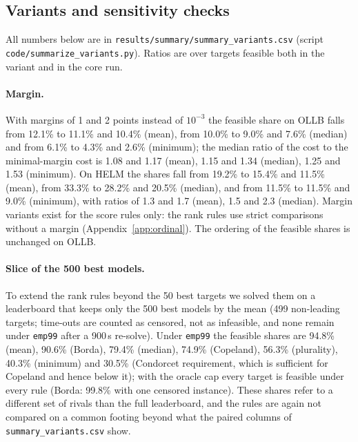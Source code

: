 \documentclass{article}
\begin{document}
\subsection*{Variants and sensitivity checks}
All numbers below are in \texttt{results/summary/summary\_variants.csv} (script \texttt{code/summarize\_variants.py}). Ratios are over targets feasible both in the variant and in the core run.
\paragraph{Margin.} With margins of 1 and 2 points instead of $10^{-3}$ the feasible share on OLLB falls from 12.1\% to 11.1\% and 10.4\% (mean), from 10.0\% to 9.0\% and 7.6\% (median) and from 6.1\% to 4.3\% and 2.6\% (minimum); the median ratio of the cost to the minimal-margin cost is 1.08 and 1.17 (mean), 1.15 and 1.34 (median), 1.25 and 1.53 (minimum). On HELM the shares fall from 19.2\% to 15.4\% and 11.5\% (mean), from 33.3\% to 28.2\% and 20.5\% (median), and from 11.5\% to 11.5\% and 9.0\% (minimum), with ratios of 1.3 and 1.7 (mean), 1.5 and 2.3 (median). Margin variants exist for the score rules only: the rank rules use strict comparisons without a margin (Appendix~\ref{app:ordinal}). The ordering of the feasible shares is unchanged on OLLB.
\paragraph{Slice of the 500 best models.} To extend the rank rules beyond the 50 best targets we solved them on a leaderboard that keeps only the 500 best models by the mean (499 non-leading targets; time-outs are counted as censored, not as infeasible, and none remain under \texttt{emp99} after a 900\,s re-solve). Under \texttt{emp99} the feasible shares are 94.8\% (mean), 90.6\% (Borda), 79.4\% (median), 74.9\% (Copeland), 56.3\% (plurality), 40.3\% (minimum) and 30.5\% (Condorcet requirement, which is sufficient for Copeland and hence below it); with the oracle cap every target is feasible under every rule (Borda: 99.8\% with one censored instance). These shares refer to a different set of rivals than the full leaderboard, and the rules are again not compared on a common footing beyond what the paired columns of \texttt{summary\_variants.csv} show.
\end{document}
